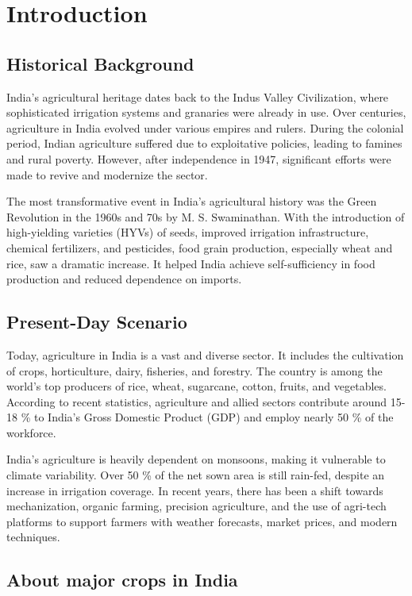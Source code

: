 \section{Introduction}

\subsection{Historical Background}
India’s agricultural heritage dates back to the Indus Valley Civilization, where sophisticated irrigation systems and granaries were already in use. Over centuries, agriculture in India evolved under various empires and rulers. During the colonial period, Indian agriculture suffered due to exploitative policies, leading to famines and rural poverty. However, after independence in 1947, significant efforts were made to revive and modernize the sector.

The most transformative event in India’s agricultural history was the Green Revolution in the 1960s and 70s by M. S. Swaminathan. With the introduction of high-yielding varieties (HYVs) of seeds, improved irrigation infrastructure, chemical fertilizers, and pesticides, food grain production, especially wheat and rice, saw a dramatic increase. It helped India achieve self-sufficiency in food production and reduced dependence on imports.

\subsection{Present-Day Scenario}
Today, agriculture in India is a vast and diverse sector. It includes the cultivation of crops, horticulture, dairy, fisheries, and forestry. The country is among the world’s top producers of rice, wheat, sugarcane, cotton, fruits, and vegetables. According to recent statistics, agriculture and allied sectors contribute around 15-18 \% to India’s Gross Domestic Product (GDP) and employ nearly 50 \% of the workforce.

India’s agriculture is heavily dependent on monsoons, making it vulnerable to climate variability. Over 50 \% of the net sown area is still rain-fed, despite an increase in irrigation coverage. In recent years, there has been a shift towards mechanization, organic farming, precision agriculture, and the use of agri-tech platforms to support farmers with weather forecasts, market prices, and modern techniques.

\subsection{About major crops in India }

